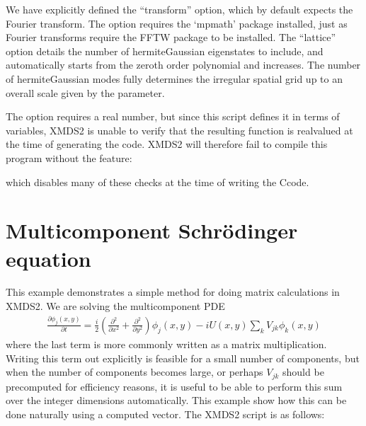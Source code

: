 \documentclass[letterpaper,10pt,english]{sphinxmanual}
\begin{document}
\sphinxAtStartPar
We have explicitly defined the “transform” option, which by default expects the Fourier transform.  The  option requires the ‘mpmath’ package installed, just as Fourier transforms require the FFTW package to be installed.  The “lattice” option details the number of hermite\sphinxhyphen{}Gaussian eigenstates to include, and automatically starts from the zeroth order polynomial and increases.  The number of hermite\sphinxhyphen{}Gaussian modes fully determines the irregular spatial grid up to an overall scale given by the  parameter.

\sphinxAtStartPar
The  option requires a real number, but since this script defines it in terms of variables, XMDS2 is unable to verify that the resulting function is real\sphinxhyphen{}valued at the time of generating the code.  XMDS2 will therefore fail to compile this program without the feature:

\begin{sphinxVerbatim}[commandchars=\\\{\}]
  
\end{sphinxVerbatim}

\sphinxAtStartPar
which disables many of these checks at the time of writing the C\sphinxhyphen{}code.


\section{Multi\sphinxhyphen{}component Schrödinger equation}
\label{\detokenize{worked_examples:multi-component-schrodinger-equation}}\label{\detokenize{worked_examples:dmultistatese}}
\sphinxAtStartPar
This example demonstrates a simple method for doing matrix calculations in XMDS2.  We are solving the multi\sphinxhyphen{}component PDE
\begin{equation*}
\begin{split}\frac{\partial \phi_j(x,y)}{\partial t} = \frac{i}{2}\left(\frac{\partial^2}{\partial x^2}+\frac{\partial^2}{\partial y^2}\right)\phi_j(x,y) - i U(x,y) \sum_k V_{j k}\phi_k(x,y)\end{split}
\end{equation*}
\sphinxAtStartPar
where the last term is more commonly written as a matrix multiplication.  Writing this term out explicitly is feasible for a small number of components, but when the number of components becomes large, or perhaps \(V_{j k}\) should be precomputed for efficiency reasons, it is useful to be able to perform this sum over the integer dimensions automatically.  This example show how this can be done naturally using a computed vector.  The XMDS2 script is as follows:
\end{document}
